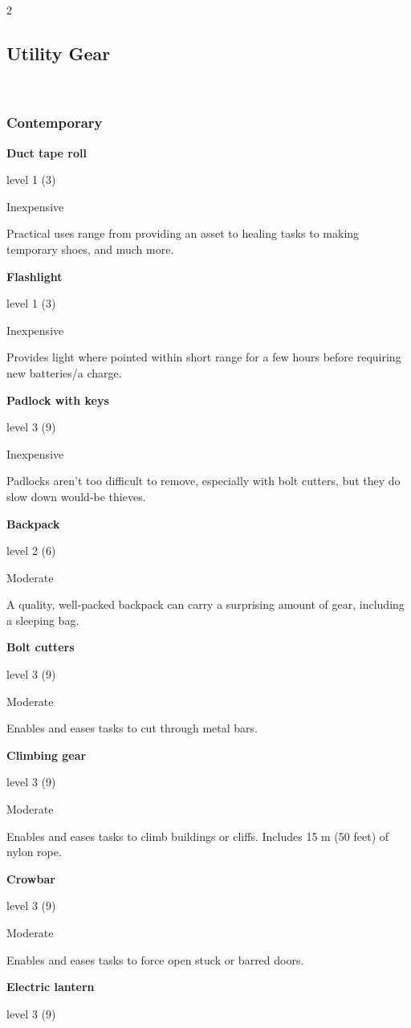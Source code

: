 \begin{multicols}{2}
\subsection{Utility Gear}
 
\subsubsection{Contemporary}

\textbf{Duct tape roll}

level 1 (3) 

Inexpensive

Practical uses range from providing an asset to healing tasks to making temporary shoes,
and much more.

\textbf{Flashlight} 

level 1 (3)

Inexpensive 

Provides light where pointed within short range for a few hours before requiring new batteries/a charge. 

\textbf{Padlock with keys} 

level 3 (9) 

Inexpensive 

Padlocks aren’t too difficult to remove, especially with bolt cutters, but they do slow down would-be thieves. 

\textbf{Backpack} 

level 2 (6) 

Moderate 

A quality, well-packed backpack can carry a surprising amount of gear, including a sleeping bag. 

\textbf{Bolt cutters} 

level 3 (9) 

Moderate 

Enables and eases tasks to cut through metal bars. 

\textbf{Climbing gear} 

level 3 (9) 

Moderate 

Enables and eases tasks to climb buildings or cliffs. Includes 15 m (50 feet) of nylon rope. 

\textbf{Crowbar} 

level 3 (9) 

Moderate 

Enables and eases tasks to force open stuck or barred doors.

\textbf{Electric lantern} 

level 3 (9)


\end{multicols}
